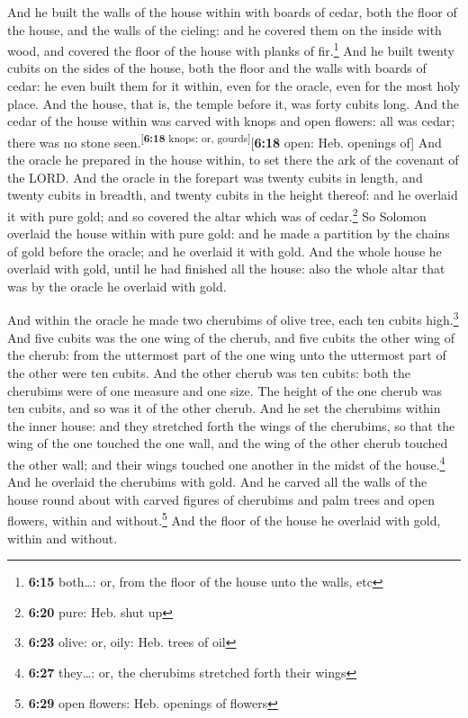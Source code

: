  And he built the walls of the house within with boards
of cedar, both the floor of the house, and the walls of the cieling: and
he covered them on the inside with wood, and covered the floor of the
house with planks of fir.\footnote{\textbf{6:15} both\ldots: or, from
  the floor of the house unto the walls, etc}  And he
built twenty cubits on the sides of the house, both the floor and the
walls with boards of cedar: he even built them for it within, even for
the oracle, even for the most holy place.  And the house,
that is, the temple before it, was forty cubits long. 
And the cedar of the house within was carved with knops and open
flowers: all was cedar; there was no stone
seen.\textsuperscript{{[}\textbf{6:18} knops: or,
gourds{]}}{[}\textbf{6:18} open: Heb. openings of{]}  And
the oracle he prepared in the house within, to set there the ark of the
covenant of the LORD.  And the oracle in the forepart was
twenty cubits in length, and twenty cubits in breadth, and twenty cubits
in the height thereof: and he overlaid it with pure gold; and so covered
the altar which was of cedar.\footnote{\textbf{6:20} pure: Heb. shut up}
 So Solomon overlaid the house within with pure gold: and
he made a partition by the chains of gold before the oracle; and he
overlaid it with gold.  And the whole house he overlaid
with gold, until he had finished all the house: also the whole altar
that was by the oracle he overlaid with gold.

 And within the oracle he made two cherubims of olive
tree, each ten cubits high.\footnote{\textbf{6:23} olive: or, oily: Heb.
  trees of oil}  And five cubits was the one wing of the
cherub, and five cubits the other wing of the cherub: from the uttermost
part of the one wing unto the uttermost part of the other were ten
cubits.  And the other cherub was ten cubits: both the
cherubims were of one measure and one size.  The height
of the one cherub was ten cubits, and so was it of the other cherub.
 And he set the cherubims within the inner house: and
they stretched forth the wings of the cherubims, so that the wing of the
one touched the one wall, and the wing of the other cherub touched the
other wall; and their wings touched one another in the midst of the
house.\footnote{\textbf{6:27} they\ldots: or, the cherubims stretched
  forth their wings}  And he overlaid the cherubims with
gold.  And he carved all the walls of the house round
about with carved figures of cherubims and palm trees and open flowers,
within and without.\footnote{\textbf{6:29} open flowers: Heb. openings
  of flowers}  And the floor of the house he overlaid
with gold, within and without.

